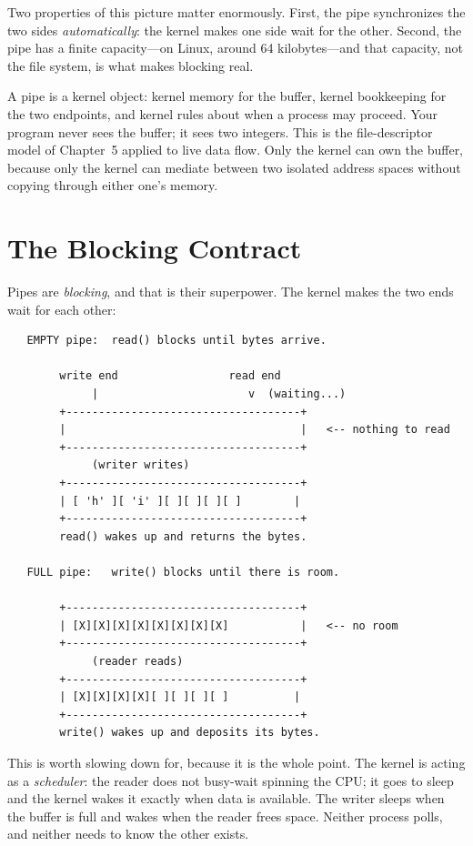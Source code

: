 Two properties of this picture matter enormously. First, the pipe
synchronizes the two sides \emph{automatically}: the kernel makes one
side wait for the other. Second, the pipe has a finite capacity---on
Linux, around 64 kilobytes---and that capacity, not the file system, is
what makes blocking real.

\begin{osconcept}
A pipe is a kernel object: kernel memory for the buffer, kernel
bookkeeping for the two endpoints, and kernel rules about when a
process may proceed. Your program never sees the buffer; it sees two
integers. This is the file-descriptor model of Chapter~5 applied to
live data flow. Only the kernel can own the buffer, because only the
kernel can mediate between two isolated address spaces without copying
through either one's memory.
\end{osconcept}

\section{The Blocking Contract}

Pipes are \emph{blocking}, and that is their superpower. The kernel
makes the two ends wait for each other:

\begin{verbatim}
   EMPTY pipe:  read() blocks until bytes arrive.

        write end                 read end
             |                       v  (waiting...)
        +------------------------------------+
        |                                    |   <-- nothing to read
        +------------------------------------+
             (writer writes)
        +------------------------------------+
        | [ 'h' ][ 'i' ][ ][ ][ ][ ]        |
        +------------------------------------+
        read() wakes up and returns the bytes.

   FULL pipe:   write() blocks until there is room.

        +------------------------------------+
        | [X][X][X][X][X][X][X][X]           |   <-- no room
        +------------------------------------+
             (reader reads)
        +------------------------------------+
        | [X][X][X][X][ ][ ][ ][ ]          |
        +------------------------------------+
        write() wakes up and deposits its bytes.
\end{verbatim}

This is worth slowing down for, because it is the whole point. The
kernel is acting as a \emph{scheduler}: the reader does not busy-wait
spinning the CPU; it goes to sleep and the kernel wakes it exactly when
data is available. The writer sleeps when the buffer is full and wakes
when the reader frees space. Neither process polls, and neither needs
to know the other exists.

